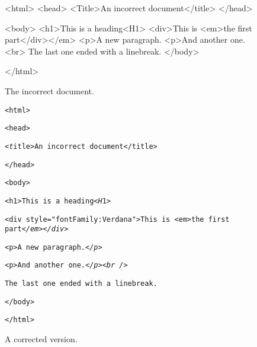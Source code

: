 \begin{figure}
\label{fig:xhtmlDocumentExample}

\begin{verbatim*}
<html>
<head>
<Title>An incorrect document</title>
</head>

<body>
<h1>This is a heading<H1>
<div>This is <em>the first part</div></em>
<p>A new paragraph.
<p>And another one.<br>
The last one ended with a linebreak.
</body>

</html>
\end{verbatim*}


The incorrect document.


\verb*-<html>-

\verb*-<head>-

\verb*-<-\emph{\texttt{t}}\verb*-itle>An incorrect document</title>-

\verb*-</head>-

\verb*-<body>-

\verb*-<h1>This is a heading<-\emph{\texttt{H}}\verb*-1>-
     
\verb*-<div style=-\emph{\texttt{"}}\verb*-fontFamily:Verdana-\emph{\texttt{"}}\verb*->This is <em>the first part-\emph{\texttt{</em></div>}}

\verb*-<p>A new paragraph.-\emph{\texttt{</p>}}

\verb*-<p>And another one.-\emph{\texttt{</p><br />}}

\verb*-The last one ended with a linebreak.-

\verb*-</body>-

\verb*-</html>-

A corrected version.


\end{figure}


